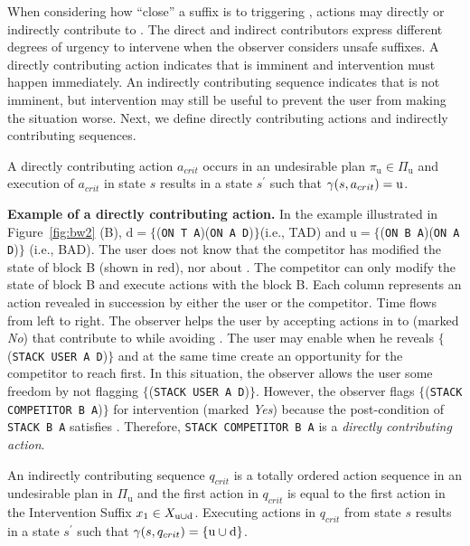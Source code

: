 When considering how ``close'' a suffix is to triggering \undesired, actions may directly or indirectly contribute to \undesired.
The direct and indirect contributors express different degrees of urgency to intervene when the observer considers unsafe suffixes. 
A directly contributing action indicates that \undesired is imminent and intervention must happen immediately. 
An indirectly contributing sequence indicates that \undesired is not imminent, but
intervention may still be useful to prevent the user from making the situation worse.
Next, we define directly contributing actions and indirectly contributing sequences. 

\begin{definition}
\label{def:direct}
A \textnormal{directly contributing action} $a_{crit}$ occurs in an undesirable plan $\pi_{\mathrm{u}}\in \Pi_{\mathrm{u}}$ and execution of $a_{crit}$ in state $s$ results in a state $s^\prime$ such that $\gamma(s,a_{crit})=\mathrm{u}$. 
\end{definition}

\textbf{Example of a directly contributing action.} 
In the example illustrated in Figure~\ref{fig:bw2} (B), $\mathrm{d}=\lbrace$(\texttt{ON T A})(\texttt{ON A D})$\rbrace$(i.e., TAD) and $\mathrm{u}=\lbrace$(\texttt{ON B A})(\texttt{ON A D})$\rbrace$ (i.e., BAD).
The user does not know that the competitor has modified the state of block B (shown in red), nor about \undesired. 
The competitor can only modify the state of block B and execute actions with the block B.
Each column represents an action revealed in succession by either the user or the competitor. Time flows from left to right.
The observer helps the user by accepting actions in to \historyDef (marked \textit{No}) that contribute to \desired while avoiding \undesired. 
The user may enable \desired when he reveals $\lbrace$(\texttt{STACK USER A D})$\rbrace$ and at the same time create an opportunity for the competitor to reach \undesired first.
In this situation, the observer allows the user some freedom by not flagging $\lbrace$(\texttt{STACK USER A D})$\rbrace$.
However, the observer flags $\lbrace$(\texttt{STACK COMPETITOR B A})$\rbrace$ for intervention (marked \textit{Yes}) because the post-condition of \texttt{STACK B A} satisfies \undesired. Therefore, \texttt{STACK COMPETITOR B A} is a \textit{directly contributing action}.


\begin{definition}
\label{def:indirect}
An \textnormal{indirectly contributing sequence} $q_{crit}$ is a totally ordered action sequence in an undesirable plan in $\Pi_{\mathrm{u}}$ and the first action in $q_{crit}$ is equal to the first action in the Intervention Suffix $x_1 \in X_{\mathrm{u}\cup\mathrm{d}}$. Executing actions in $q_{crit}$ from state $s$ results in a state $s^\prime$ such that $\gamma(s,q_{crit})=\lbrace\mathrm{u}\cup\mathrm{d}\rbrace$.
\end{definition}
 
